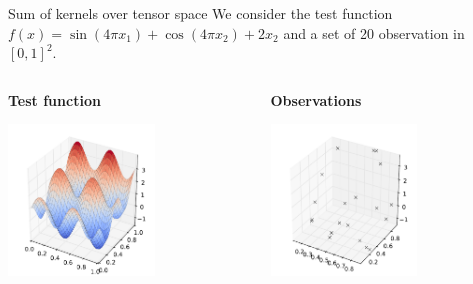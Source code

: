 \documentclass{beamer}
\begin{document}
\begin{frame}{Sum of kernels over tensor space}
We consider the test function $f(x) = \sin( 4 \pi x_1) + \cos( 4 \pi x_2) + 2 x_2$ and a set of 20 observation in $[0,1]^2$. \\ \vspace{5mm}
\begin{columns}[c]
\begin{column}{5cm}
\textbf{Test function}
\begin{center}
\includegraphics[height=4cm]{figures/python/newfromold-productvssum2-predt}
\end{center}
\end{column}
\begin{column}{5cm}
\textbf{Observations}
\begin{center}
\includegraphics[height=4cm]{figures/python/newfromold-productvssum2-preddoe}
\end{center}
\end{column}
\end{columns} 
\vspace{5mm}
\
\end{frame}
\end{document}
